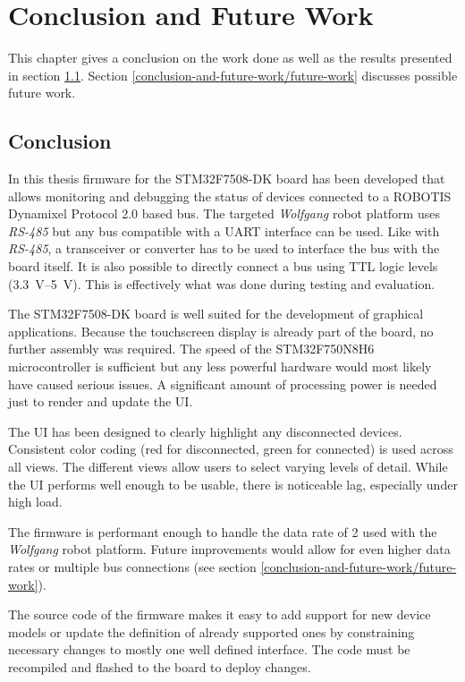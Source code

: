 \chapter{Conclusion and Future Work}
\label{conclusion-and-future-work}

This chapter gives a conclusion on the work done as well as the results presented in section
\ref{conclusion-and-future-work/conclusion}. Section \ref{conclusion-and-future-work/future-work}
discusses possible future work.

\section{Conclusion}
\label{conclusion-and-future-work/conclusion}

In this thesis firmware for the STM32F7508-DK board has been developed that allows monitoring and
debugging the status of devices connected to a ROBOTIS Dynamixel Protocol 2.0 based bus. The targeted
\textit{Wolfgang} robot platform uses \textit{RS-485} but any bus compatible with a UART interface
can be used. Like with \textit{RS-485}, a transceiver or converter has to be used to interface the
bus with the board itself. It is also possible to directly connect a bus using TTL logic levels
(\SIrange{3.3}{5}{\volt}). This is effectively what was done during testing and evaluation.

The STM32F7508-DK board is well suited for the development of graphical applications. Because the
touchscreen display is already part of the board, no further assembly was required. The speed of
the STM32F750N8H6 microcontroller is sufficient but any less powerful hardware would most likely
have caused serious issues. A significant amount of processing power is needed just to render and
update the UI.

The UI has been designed to clearly highlight any disconnected devices. Consistent color coding
(red for disconnected, green for connected) is used across all views. The different views allow
users to select varying levels of detail. While the UI performs well enough to be usable, there
is noticeable lag, especially under high load.

The firmware is performant enough to handle the data rate of \SI{2}{} used with the
\textit{Wolfgang} robot platform. Future improvements would allow for even higher data rates or
multiple bus connections (see section \ref{conclusion-and-future-work/future-work}).

The source code of the firmware makes it easy to add support for new device models or update the
definition of already supported ones by constraining necessary changes to mostly one well defined
interface. The code must be recompiled and flashed to the board to deploy changes.

